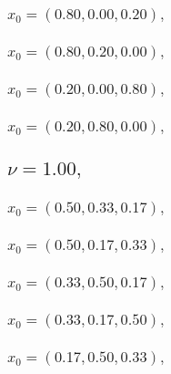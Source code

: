 \documentclass[a4paper]{article}
\begin{document}
\begin{multicols*}{2}
   \subsubsection{\(x_0 = (0.80,0.00,0.20),\quad \)}
   

   \subsubsection{\(x_0 = (0.80,0.20,0.00),\quad \)}
   

   \subsubsection{\(x_0 = (0.20,0.00,0.80),\quad \)}
   

   \subsubsection{\(x_0 = (0.20,0.80,0.00),\quad \)}
   

   \subsection{\(\nu = 1.00,\quad \)}
   

   \subsubsection{\(x_0 = (0.50,0.33,0.17),\quad \)}
   

   \subsubsection{\(x_0 = (0.50,0.17,0.33),\quad \)}
   

   \subsubsection{\(x_0 = (0.33,0.50,0.17),\quad \)}
   

   \subsubsection{\(x_0 = (0.33,0.17,0.50),\quad \)}
   

   \subsubsection{\(x_0 = (0.17,0.50,0.33),\quad \)}
   


\end{multicols*}
\end{document}
